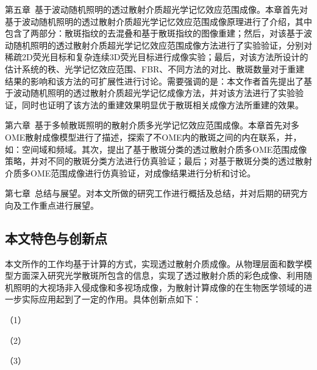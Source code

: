 第五章\  基于波动随机照明的透过散射介质超光学记忆效应范围成像。本章首先对基于波动随机照明的透过散射介质超光学记忆效应范围成像原理进行了介绍，其中包含了两部分：散斑指纹的去混叠和基于散斑指纹的图像重建；然后，对该基于波动随机照明的透过散射介质超光学记忆效应范围成像方法进行了实验验证，分别对稀疏2D荧光目标和复杂连续3D荧光目标进行成像实验；最后，对该方法所设计的估计系统的秩、光学记忆效应范围、FBR、不同方法的对比、散斑数量对于重建结果的影响和该方法的可扩展性进行讨论。需要强调的是：本文作者首先提出了基于波动随机照明的透过散射介质超光学记忆成像方法，并对该方法进行了实验验证，同时也证明了该方法的重建效果明显优于散斑相关成像方法所重建的效果。

第六章\ 基于多帧散斑照明的散射介质多光学记忆效应范围成像。本章首先对多OME散射成像模型进行了描述，探索了不OME内的散斑之间的内在联系，并，如：空间域和频域。其次，提出了基于散斑分类的透过散射介质多OME范围成像策略，并对不同的散斑分类方法进行仿真验证；最后；对基于散斑分类的透过散射介质多OME范围成像进行仿真验证，对成像结果进行分析和讨论。

第七章\ 总结与展望。对本文所做的研究工作进行概括及总结，并对后期的研究方向及工作重点进行展望。

\subsection{本文特色与创新点}

本文所作的工作均基于计算的方式，实现透过散射介质成像。从物理层面和数学模型方面深入研究光学散斑所包含的信息，实现了透过散射介质的彩色成像、利用随机照明的大视场非入侵成像和多视场成像，为散射计算成像的在生物医学领域的进一步实际应用起到了一定的作用。具体创新点如下：

（1）

（2）

（3）
